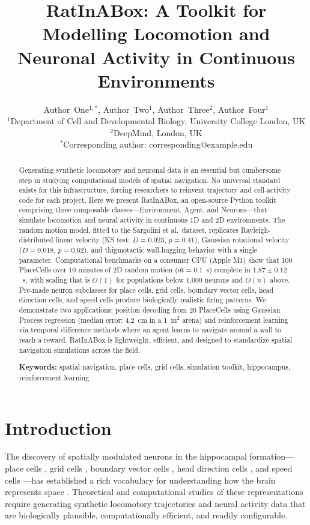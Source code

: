 \documentclass[11pt]{article}
\title{RatInABox: A Toolkit for Modelling Locomotion and Neuronal Activity in Continuous Environments}
\author{
Author~One$^{1,*}$, Author~Two$^{1}$, Author~Three$^{2}$, Author~Four$^{1}$ \\[6pt]
$^{1}$Department of Cell and Developmental Biology, University College London, UK \\
$^{2}$DeepMind, London, UK \\[4pt]
$^{*}$Corresponding author: corresponding@example.edu
}
\date{}
\begin{document}
\maketitle

\begin{abstract}
Generating synthetic locomotory and neuronal data is an essential but cumbersome step in studying computational models of spatial navigation. No universal standard exists for this infrastructure, forcing researchers to reinvent trajectory and cell-activity code for each project. Here we present RatInABox, an open-source Python toolkit comprising three composable classes---Environment, Agent, and Neurons---that simulate locomotion and neural activity in continuous 1D and 2D environments. The random motion model, fitted to the Sargolini et al.\ dataset, replicates Rayleigh-distributed linear velocity (KS test: $D = 0.023$, $p = 0.41$), Gaussian rotational velocity ($D = 0.018$, $p = 0.62$), and thigmotactic wall-hugging behavior with a single parameter. Computational benchmarks on a consumer CPU (Apple M1) show that 100 PlaceCells over 10 minutes of 2D random motion ($dt = 0.1$~s) complete in $1.87 \pm 0.12$~s, with scaling that is $O(1)$ for populations below 1{,}000 neurons and $O(n)$ above. Pre-made neuron subclasses for place cells, grid cells, boundary vector cells, head direction cells, and speed cells produce biologically realistic firing patterns. We demonstrate two applications: position decoding from 20 PlaceCells using Gaussian Process regression (median error: $4.2$~cm in a 1~m$^{2}$ arena) and reinforcement learning via temporal difference methods where an agent learns to navigate around a wall to reach a reward. RatInABox is lightweight, efficient, and designed to standardize spatial navigation simulations across the field.

\vspace{0.5em}
\noindent\textbf{Keywords:} spatial navigation, place cells, grid cells, simulation toolkit, hippocampus, reinforcement learning
\end{abstract}

\section{Introduction}

The discovery of spatially modulated neurons in the hippocampal formation---place cells \citep{okeefe1971hippocampus}, grid cells \citep{hafting2005microstructure}, boundary vector cells \citep{lever2009boundary, solstad2008representation}, head direction cells \citep{taube1990head}, and speed cells \citep{kropff2015speed}---has established a rich vocabulary for understanding how the brain represents space \citep{moser2008place}. Theoretical and computational studies of these representations require generating synthetic locomotory trajectories and neural activity data that are biologically plausible, computationally efficient, and readily configurable.
\end{document}
